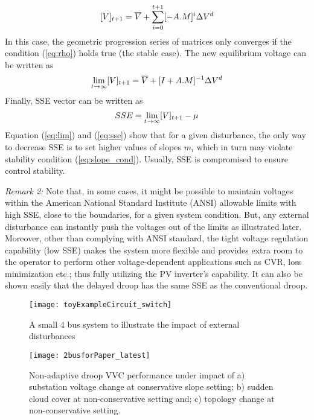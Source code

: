 \documentclass[journal]{IEEEtran}
\begin{document}
\begin{equation}
\small 
\label{eq:diff4}
[V]_{t+1}=\overline V+\sum_{i=0}^{t+1}[-A.M]^{i}\Delta V^d
\vspace{-1mm}
\end{equation}
In this case, the geometric progression series of matrices only converges if the condition (\ref{eq:rho}) holds true (the stable case). The new equilibrium voltage can be written as
\begin{equation}
\small
\label{eq:lim}
\lim_{t\to \infty}[V]_{t+1}=\overline V+[I+A.M]^{-1}\Delta V^d
\end{equation}
Finally, SSE vector can be written as
\begin{equation}
\small
\label{eq:sse}
SSE = \lim_{t\to \infty}[V]_{t+1} - \mu
\end{equation}
Equation (\ref{eq:lim}) and (\ref{eq:sse}) show that for a given disturbance, the only way to decrease SSE is to set higher values of slopes $m_i$ which in turn may violate stability condition (\ref{eq:slope_cond}). Usually, SSE is compromised to ensure control stability.

\textit{Remark 2:} Note that, in some cases, it might be possible to maintain voltages within the American National Standard Institute (ANSI) allowable limits with high SSE, close to the boundaries, for a given system condition. But, any external disturbance can instantly push the voltages out of the limits as illustrated later. Moreover, other than complying with ANSI standard, the tight voltage regulation capability (low SSE) makes the system more flexible and provides extra room to the operator to perform other voltage-dependent applications such as CVR, loss minimization etc.; thus fully utilizing the PV inverter’s capability. It can also be shown easily that the delayed droop has the same SSE as the conventional droop.

\begin{figure} [t]
	\centering
	\texttt{[image: toyExampleCircuit\_switch]}
    \vspace{-1mm}
    \caption {A small 4 bus system to illustrate the impact of external disturbances }
    \label{fig:toy_ckt}
\vspace{2mm}

	\centering
	\texttt{[image: 2busforPaper\_latest]}
    \vspace{-2.5mm}
    \caption {Non-adaptive droop VVC performance under impact of a) substation voltage change at conservative slope setting; b) sudden cloud cover at non-conservative setting and; c) topology change at non-conservative setting.}
    \label{fig:toy_results}   
    \vspace{-0.5mm}
\end{figure}
\end{document}
